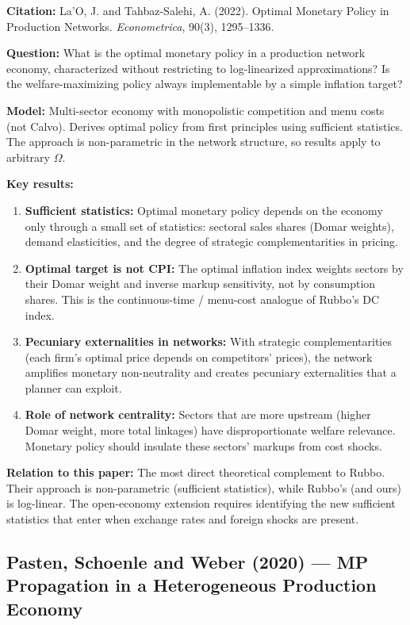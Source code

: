 \documentclass[12pt]{article}
\begin{document}
\textbf{Citation:} La'O, J. and Tahbaz-Salehi, A. (2022). Optimal Monetary Policy in Production Networks. \textit{Econometrica}, 90(3), 1295--1336.

\textbf{Question:} What is the optimal monetary policy in a production network economy, characterized without restricting to log-linearized approximations? Is the welfare-maximizing policy always implementable by a simple inflation target?

\textbf{Model:} Multi-sector economy with monopolistic competition and menu costs (not Calvo). Derives optimal policy from first principles using sufficient statistics. The approach is non-parametric in the network structure, so results apply to arbitrary $\Omega$.

\textbf{Key results:}
\begin{enumerate}
    \item \textbf{Sufficient statistics:} Optimal monetary policy depends on the economy only through a small set of statistics: sectoral sales shares (Domar weights), demand elasticities, and the degree of strategic complementarities in pricing.
    \item \textbf{Optimal target is not CPI:} The optimal inflation index weights sectors by their Domar weight and inverse markup sensitivity, not by consumption shares. This is the continuous-time / menu-cost analogue of Rubbo's DC index.
    \item \textbf{Pecuniary externalities in networks:} With strategic complementarities (each firm's optimal price depends on competitors' prices), the network amplifies monetary non-neutrality and creates pecuniary externalities that a planner can exploit.
    \item \textbf{Role of network centrality:} Sectors that are more upstream (higher Domar weight, more total linkages) have disproportionate welfare relevance. Monetary policy should insulate these sectors' markups from cost shocks.
\end{enumerate}

\textbf{Relation to this paper:} The most direct theoretical complement to Rubbo. Their approach is non-parametric (sufficient statistics), while Rubbo's (and ours) is log-linear. The open-economy extension requires identifying the new sufficient statistics that enter when exchange rates and foreign shocks are present.

\subsection{Pasten, Schoenle and Weber (2020) --- MP Propagation in a Heterogeneous Production Economy}
\end{document}
